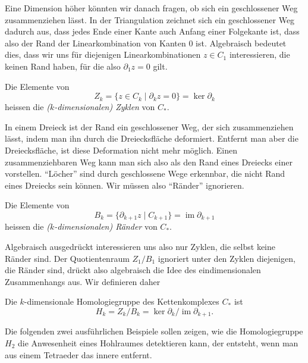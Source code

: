 Eine Dimension höher könnten wir danach fragen, ob sich ein geschlossener
Weg zusammenziehen lässt.
In der Triangulation zeichnet sich ein geschlossener Weg dadurch aus,
dass jedes Ende einer Kante auch Anfang einer Folgekante ist, dass also
der Rand der Linearkombination von Kanten 0 ist.
Algebraisch bedeutet dies, dass wir uns für diejenigen Linearkombinationen
$z\in C_1$ interessieren, die keinen Rand haben, für die also $\partial_1z=0$
gilt.

\begin{definition}
Die Elemente von
\[
Z_k
=
\{z\in C_k\;|\; \partial_k z = 0\}
=
\ker \partial_k
\]
heissen die {\em ($k$-dimensionalen) Zyklen} von $C_*$.
\end{definition}

In einem Dreieck ist der Rand ein geschlossener Weg, der sich zusammenziehen
lässt, indem man ihn durch die Dreiecksfläche deformiert.
Entfernt man aber die Dreiecksfläche, ist diese Deformation nicht mehr
möglich.
Einen zusammenziehbaren Weg kann man sich also als den Rand eines Dreiecks
einer vorstellen.
``Löcher'' sind durch geschlossene Wege erkennbar, die nicht Rand eines
Dreiecks sein können.
Wir müssen also ``Ränder'' ignorieren.

\begin{definition}
Die Elemente von
\[
B_k
=
\{\partial_{k+1}z\;|\; C_{k+1}\}
=
\operatorname{im} \partial_{k+1}
\]
heissen die {\em ($k$-dimensionalen) Ränder} von $C_*$.
\end{definition}

Algebraisch ausgedrückt interessieren uns also nur Zyklen, die selbst
keine Ränder sind.
Der Quotientenraum $Z_1/B_1$ ignoriert unter den Zyklen diejenigen, die
Ränder sind, drückt also algebraisch die Idee des eindimensionalen
Zusammenhangs aus.
Wir definieren daher

\begin{definition}
Die $k$-dimensionale Homologiegruppe des Kettenkomplexes $C_*$ ist
\[
H_k = Z_k/B_k = \ker \partial_k / \operatorname{im} \partial_{k+1}.
\]
\end{definition}

Die folgenden zwei ausführlichen Beispiele sollen zeigen, wie die
Homologiegruppe $H_2$ die Anwesenheit eines Hohlraumes detektieren kann,
der entsteht, wenn man aus einem Tetraeder das innere entfernt.

